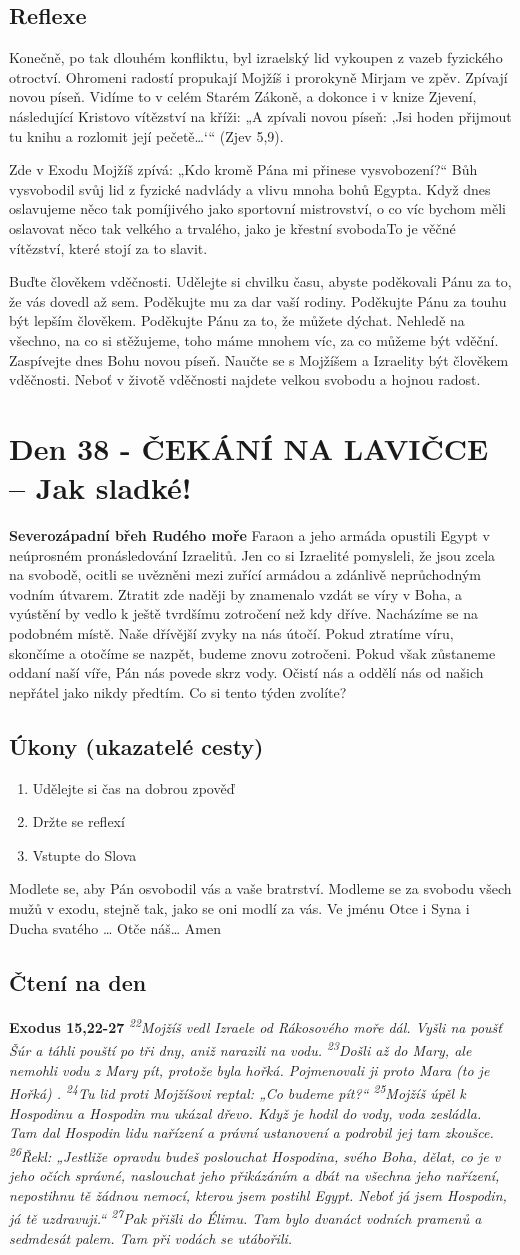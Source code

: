\documentclass[11pt]{article}
\newcommand{\zacatekSestyTyden}{
  \textbf{Severozápadní břeh Rudého moře} \newline 
  Faraon a jeho armáda opustili Egypt v neúprosném pronásledování Izraelitů. Jen co si Izraelité pomysleli, že jsou zcela na svobodě, ocitli se uvězněni mezi zuřící armádou a zdánlivě neprůchodným vodním útvarem. Ztratit zde naději by znamenalo vzdát se víry v Boha, a vyústění by vedlo k ještě tvrdšímu zotročení než kdy dříve. Nacházíme se na podobném místě. Naše dřívější zvyky na nás útočí. Pokud ztratíme víru, skončíme a otočíme se nazpět, budeme znovu zotročeni. Pokud však zůstaneme oddaní naší víře, Pán nás povede skrz vody. Očistí nás a oddělí nás od našich nepřátel jako nikdy předtím. Co si tento týden zvolíte?

\subsection*{Úkony (ukazatelé cesty)}
\begin{enumerate}
  \item Udělejte si čas na dobrou zpověď
  \item Držte se reflexí
  \item Vstupte do Slova
\end{enumerate}
Modlete se, aby Pán osvobodil vás a vaše bratrství. \newline
Modleme se za svobodu všech mužů v exodu, stejně tak, jako se oni modlí za vás.\newline
Ve jménu Otce i Syna i Ducha svatého …  Otče náš… Amen
}
\begin{document}
\subsection*{Reflexe}
Konečně, po tak dlouhém konfliktu, byl izraelský lid vykoupen z vazeb fyzického otroctví. Ohromeni radostí propukají Mojžíš i
prorokyně Mirjam ve zpěv. Zpívají novou píseň. Vidíme to v celém Starém Zákoně, a dokonce i v knize Zjevení, následující
Kristovo vítězství na kříži: „A zpívali novou píseň: ‚Jsi hoden přijmout tu knihu a rozlomit její pečetě…‘“ (Zjev 5,9).

Zde v Exodu Mojžíš zpívá: „Kdo kromě Pána mi přinese vysvobození?“ Bůh vysvobodil svůj lid z fyzické nadvlády a vlivu mnoha
bohů Egypta. Když dnes oslavujeme něco tak pomíjivého jako sportovní mistrovství, o co víc bychom měli oslavovat něco tak
velkého a trvalého, jako je křestní svobodaTo je věčné vítězství, které stojí za to slavit.

Buďte člověkem vděčnosti. Udělejte si chvilku času, abyste poděkovali Pánu za to, že vás dovedl až sem. Poděkujte mu za dar vaší
rodiny. Poděkujte Pánu za touhu být lepším člověkem. Poděkujte Pánu za to, že můžete dýchat. Nehledě na všechno, na co si
stěžujeme, toho máme mnohem víc, za co můžeme být vděční. Zaspívejte dnes Bohu novou píseň. Naučte se s Mojžíšem a
Izraelity být člověkem vděčnosti. Neboť v životě vděčnosti najdete velkou svobodu a hojnou radost.


\newpage
\section{Den 38 - ČEKÁNÍ NA LAVIČCE – Jak sladké!}
\zacatekSestyTyden
\subsection*{Čtení na den}
\textbf{Exodus 15,22-27}
\newline
\textit{
\textsuperscript{22}Mojžíš vedl Izraele od Rákosového moře dál. Vyšli na poušť Šúr a táhli pouští po tři dny, aniž narazili na vodu.
\textsuperscript{23}Došli až do Mary, ale nemohli vodu z Mary pít, protože byla hořká. Pojmenovali ji proto Mara (to je Hořká) .
\textsuperscript{24}Tu lid proti Mojžíšovi reptal: „Co budeme pít?“
\textsuperscript{25}Mojžíš úpěl k Hospodinu a Hospodin mu ukázal dřevo. Když je hodil do vody, voda zesládla. Tam dal Hospodin lidu nařízení a právní ustanovení a podrobil jej tam zkoušce.
\textsuperscript{26}Řekl: „Jestliže opravdu budeš poslouchat Hospodina, svého Boha, dělat, co je v jeho očích správné, naslouchat jeho přikázáním a dbát na všechna jeho nařízení, nepostihnu tě žádnou nemocí, kterou jsem postihl Egypt. Neboť já jsem Hospodin, já tě uzdravuji.“
\textsuperscript{27}Pak přišli do Élimu. Tam bylo dvanáct vodních pramenů a sedmdesát palem. Tam při vodách se utábořili.
}
\end{document}
